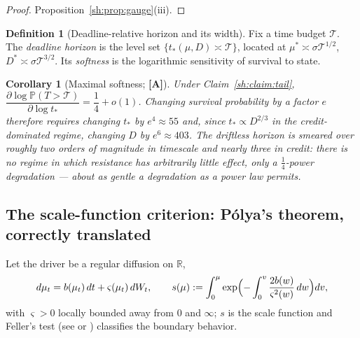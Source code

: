 \documentclass[11pt]{article}
\numberwithin{equation}{section}
\theoremstyle{plain}
\newtheorem{corollary}[theorem]{Corollary}
\theoremstyle{definition}
\newtheorem{definition}[theorem]{Definition}
\theoremstyle{remark}
\newcommand{\PP}{\mathbb{P}}
\newcommand{\R}{\mathbb{R}}
\begin{document}
\begin{proof}
Proposition~\ref{sh:prop:gauge}(iii).
\end{proof}

\begin{definition}[Deadline-relative horizon and its width]
\label{sh:def:deadline}
Fix a time budget $\mathcal T$. The \emph{deadline horizon} is the level
set $\{t_*(\mu,D)\asymp\mathcal T\}$, located at
$\mu^*\asymp\sigma\mathcal T^{1/2}$, $D^*\asymp\sigma\mathcal T^{3/2}$.
Its \emph{softness} is the logarithmic sensitivity of survival to state.
\end{definition}

\begin{corollary}[Maximal softness; \textbf{[A]}]\label{sh:cor:soft}
Under Claim~\ref{sh:claim:tail},
$\dfrac{\partial\log\PP(T>\mathcal T)}{\partial\log t_*}=\dfrac14+o(1)$.
Changing survival probability by a factor $e$ therefore requires changing
$t_*$ by $e^4\approx55$ and, since $t_*\propto D^{2/3}$ in the
credit-dominated regime, changing $D$ by $e^6\approx403$. The driftless
horizon is smeared over roughly two orders of magnitude in timescale and
nearly three in credit: there is no regime in which resistance has
arbitrarily little effect, only a $\tfrac14$-power degradation --- about as
gentle a degradation as a power law permits.
\end{corollary}

\subsection{The scale-function criterion: P\'olya's theorem, correctly
translated}\label{sh:subsub:scale}

Let the driver be a regular diffusion on $\R$,
\begin{equation}\label{sh:eq:generaldriver}
d\mu_t=b(\mu_t)\,dt+\varsigma(\mu_t)\,dW_t,\qquad
s(\mu):=\int_{0}^{\mu}\exp\Bigl(-\int_{0}^{v}\frac{2b(w)}{\varsigma^2(w)}
\,dw\Bigr)dv,
\end{equation}
with $\varsigma>0$ locally bounded away from $0$ and $\infty$; $s$ is the
scale function and Feller's test (see \cite[Ch.~15]{KT81} or
\cite[Ch.~VII]{RY99}) classifies the boundary behavior.
\end{document}
